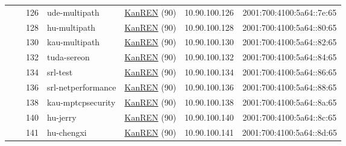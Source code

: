 \begin{small}
\begin{center}
\begin{longtable}{|c|c|c|c|c|c|c|c|}
  &  & \tiny{126} & \multicolumn{1}{|l|}{\tiny{ude-multipath}} & \multicolumn{2}{|c|}{\tiny{\href{http://www.kanren.net}{KanREN} (90)}} & \tiny{10.90.100.126} & \tiny{2001:700:4100:5a64::7e:65} \\* \cline{3-3}\cline{4-4}\cline{5-5}\cline{6-6}\cline{7-7}\cline{8-8}
  &  & \tiny{128} & \multicolumn{1}{|l|}{\tiny{hu-multipath}} & \multicolumn{2}{|c|}{\tiny{\href{http://www.kanren.net}{KanREN} (90)}} & \tiny{10.90.100.128} & \tiny{2001:700:4100:5a64::80:65} \\* \cline{3-3}\cline{4-4}\cline{5-5}\cline{6-6}\cline{7-7}\cline{8-8}
  &  & \tiny{130} & \multicolumn{1}{|l|}{\tiny{kau-multipath}} & \multicolumn{2}{|c|}{\tiny{\href{http://www.kanren.net}{KanREN} (90)}} & \tiny{10.90.100.130} & \tiny{2001:700:4100:5a64::82:65} \\* \cline{3-3}\cline{4-4}\cline{5-5}\cline{6-6}\cline{7-7}\cline{8-8}
  &  & \tiny{132} & \multicolumn{1}{|l|}{\tiny{tuda-sereon}} & \multicolumn{2}{|c|}{\tiny{\href{http://www.kanren.net}{KanREN} (90)}} & \tiny{10.90.100.132} & \tiny{2001:700:4100:5a64::84:65} \\* \cline{3-3}\cline{4-4}\cline{5-5}\cline{6-6}\cline{7-7}\cline{8-8}
  &  & \tiny{134} & \multicolumn{1}{|l|}{\tiny{srl-test}} & \multicolumn{2}{|c|}{\tiny{\href{http://www.kanren.net}{KanREN} (90)}} & \tiny{10.90.100.134} & \tiny{2001:700:4100:5a64::86:65} \\* \cline{3-3}\cline{4-4}\cline{5-5}\cline{6-6}\cline{7-7}\cline{8-8}
  &  & \tiny{136} & \multicolumn{1}{|l|}{\tiny{srl-netperformance}} & \multicolumn{2}{|c|}{\tiny{\href{http://www.kanren.net}{KanREN} (90)}} & \tiny{10.90.100.136} & \tiny{2001:700:4100:5a64::88:65} \\* \cline{3-3}\cline{4-4}\cline{5-5}\cline{6-6}\cline{7-7}\cline{8-8}
  &  & \tiny{138} & \multicolumn{1}{|l|}{\tiny{kau-mptcpsecurity}} & \multicolumn{2}{|c|}{\tiny{\href{http://www.kanren.net}{KanREN} (90)}} & \tiny{10.90.100.138} & \tiny{2001:700:4100:5a64::8a:65} \\* \cline{3-3}\cline{4-4}\cline{5-5}\cline{6-6}\cline{7-7}\cline{8-8}
  &  & \tiny{140} & \multicolumn{1}{|l|}{\tiny{hu-jerry}} & \multicolumn{2}{|c|}{\tiny{\href{http://www.kanren.net}{KanREN} (90)}} & \tiny{10.90.100.140} & \tiny{2001:700:4100:5a64::8c:65} \\* \cline{3-3}\cline{4-4}\cline{5-5}\cline{6-6}\cline{7-7}\cline{8-8}
  &  & \tiny{141} & \multicolumn{1}{|l|}{\tiny{hu-chengxi}} & \multicolumn{2}{|c|}{\tiny{\href{http://www.kanren.net}{KanREN} (90)}} & \tiny{10.90.100.141} & \tiny{2001:700:4100:5a64::8d:65} \\* \cline{3-3}\cline{4-4}\cline{5-5}\cline{6-6}\cline{7-7}\cline{8-8}

\end{longtable}
\end{center}
\end{small}
